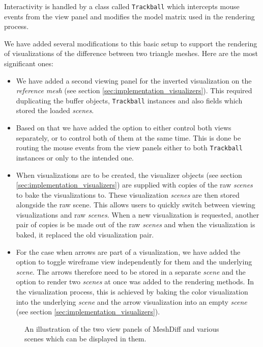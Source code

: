 Interactivity is handled by a class called \verb+Trackball+ which intercepts mouse events from the view panel and modifies the model matrix used in the rendering process.

We have added several modifications to this basic setup to support the rendering of visualizations of the difference between two triangle meshes. Here are the most significant ones:

\begin{itemize}
\item We have added a second viewing panel for the inverted visualization on the {\it reference mesh} (see section \ref{sec:implementation_visualizers}). This required duplicating the buffer objects, \verb+Trackball+ instances and also fields which stored the loaded {\it scenes}.
\item Based on that we have added the option to either control both views separately, or to control both of them at the same time. This is done be routing the mouse events from the view panels either to both \verb+Trackball+ instances or only to the intended one.
\item When visualizations are to be created, the visualizer objects (see section \ref{sec:implementation_visualizers}) are supplied with copies of the raw {\it scenes} to bake the visualizations to. These visualization {\it scenes} are then stored alongside the raw scene. This allows users to quickly switch between viewing visualizations and raw {\it scenes}. When a new visualization is requested, another pair of copies is be made out of the raw {\it scenes} and when the visualization is baked, it replaced the old visualization pair.
\item For the case when arrows are part of a visualization, we have added the option to toggle wireframe view independently for them and the underlying {\it scene}. The arrows therefore need to be stored in a separate {\it scene} and the option to render two {\it scenes} at once was added to the rendering methods. In the visualization process, this is achieved by baking the color visualization into the underlying {\it scene} and the arrow visualization into an empty {\it scene} (see section \ref{sec:implementation_visualizers}).
\end{itemize}

\begin{figure}[h]
	\centering
	\def\svgwidth{\textwidth}
	
	\caption[Scenes Explained]{An illustration of the two view panels of MeshDiff and various scenes which can be displayed in them.}
	\label{fig:scenes_explained}
\end{figure}

